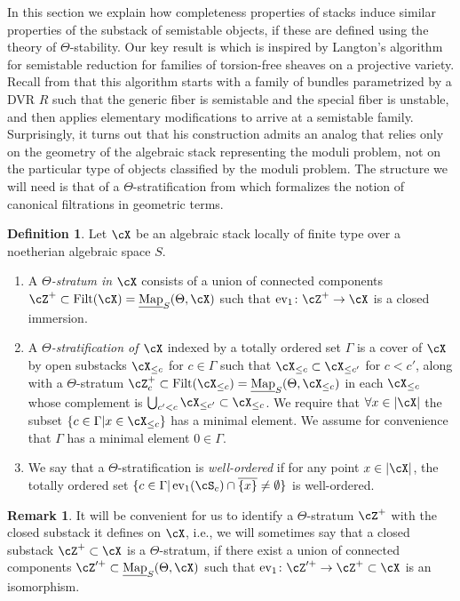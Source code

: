 \documentclass[a4paper]{amsart}
\numberwithin{equation}{section}
\theoremstyle{plain}
\theoremstyle{definition}
\newtheorem{rem}[thm]{Remark}
\newtheorem{defn}[thm]{Definition}
\DeclareMathOperator{\ev}{ev}
\DeclareMathOperator{\Filt}{Filt}
\newcommand{\uMap}{\underline{{\rm Map}}}
\newcommand{\co}{\colon}
\begin{document}
In this section we explain how completeness properties of stacks induce similar properties of the substack of semistable objects, if these are defined using the theory of $\Theta$-stability. Our key result is  {which} is inspired by Langton's algorithm for semistable reduction for families of torsion-free sheaves on a projective variety. Recall from  that this  algorithm starts with a family of bundles parametrized by a DVR $R$ such that the generic fiber is semistable and the special fiber is unstable, and then applies elementary modifications to arrive at a semistable family. Surprisingly, it turns out that his construction admits an analog that relies only on the geometry of the algebraic stack representing the moduli problem, not on the particular type of objects classified by the moduli problem. The structure we will need is that of a $\Theta$-stratification from \cite[Def.~2.1.1]{hlinstability} {which} formalizes the notion of canonical filtrations in geometric terms. 

\begin{defn}\label{D:theta-stratum}
	Let $\cX$ be an algebraic stack locally of finite type over a noetherian algebraic space $S$. 
\begin{enumerate}
	\item 	A \emph{$\Theta$-stratum in $\cX$} consists of a union of connected components $\cZ^+ \subset \Filt(\cX)=\uMap_S(\Theta,\cX)$ such that $\ev_1 \co \cZ^+ \to \cX$ is a closed immersion.	
	\item  A \emph{$\Theta$-stratification of $\cX$} indexed by a totally ordered set $\Gamma$ is a cover of $\cX$ by open substacks $\cX_{\leq c}$ for $c \in \Gamma$ such that $\cX_{\leq c} \subset \cX_{\leq c'}$ for $c < c'$, along with a $\Theta$-stratum $\cZ^+_c \subset \Filt(\cX_{\leq c})=\uMap_S(\Theta, \cX_{\leq c})$ in each $\cX_{\leq c}$ whose complement is $\bigcup_{c'<c} \cX_{\leq c'} \subset \cX_{\leq c}$. We require that $\forall x \in |\cX|$ the subset $\{c \in \Gamma| x \in \cX_{\leq c}\}$ has a minimal element. We assume for convenience that $\Gamma$ has a minimal element $0 \in \Gamma$.
	\item  We say that a $\Theta$-stratification is \emph{well-ordered} if for any point $x \in |\cX|$, the totally ordered set $\{c \in \Gamma | \ev_1(\cS_c) \cap \overline{\{x\}} \neq \emptyset\}$ is well-ordered.
\end{enumerate}		
\end{defn}	 
\begin{rem}
It will be convenient for us to identify a $\Theta$-stratum $\cZ^+$ with the closed substack it defines on $\cX$, i.e., we will sometimes say that a closed substack $\cZ^+\subset \cX$ is a $\Theta$-stratum, if there exist a union of  connected components $\cZ^{\prime+} \subset \uMap_S(\Theta,\cX)$ such that $\ev_1 \co \cZ^{\prime+} \to \cZ^+ \subset \cX$ is an isomorphism.
\end{rem}
\end{document}
